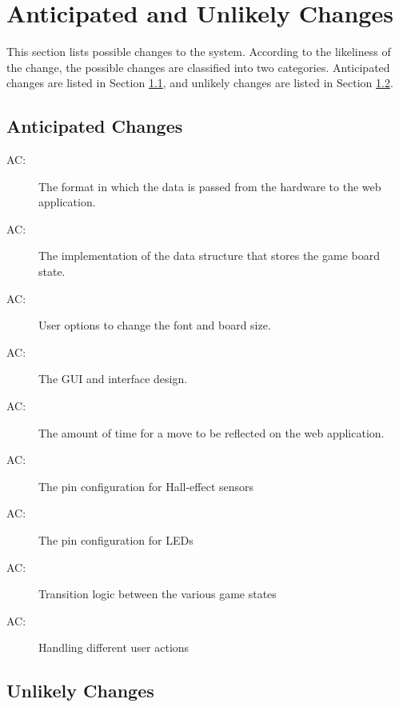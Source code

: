 \documentclass[12pt, titlepage]{article}
\newcounter{acnum}
\newcommand{\actheacnum}{AC\theacnum}
\begin{document}
\section{Anticipated and Unlikely Changes} \label{SecChange}

This section lists possible changes to the system. According to the likeliness
of the change, the possible changes are classified into two
categories. Anticipated changes are listed in Section \ref{SecAchange}, and
unlikely changes are listed in Section \ref{SecUchange}.

\subsection{Anticipated Changes} \label{SecAchange}

\begin{description}
  \item[ \actheacnum \label{acVerification}:] The format in which the data is passed from the hardware to the web application.
  \item[ \actheacnum \label{acBoardState}:] The implementation of the data structure that stores the game board state.
  \item[ \actheacnum \label{acFontAndPieces}:] User options to change the font and board size.
  \item[ \actheacnum \label{acGUI}:] The GUI and interface design.
  \item[ \actheacnum \label{acTimers}:] The amount of time for a move to be reflected on the web application.
\item[ \actheacnum \label{acHES}:] The pin configuration for Hall-effect sensors
\item[ \actheacnum \label{acLED}:] The pin configuration for LEDs
\item[ \actheacnum \label{acTGS}:] Transition logic between the various game states
\item[ \actheacnum \label{acHUA}:] Handling different user actions
\end{description}

\subsection{Unlikely Changes} \label{SecUchange}
\end{document}
